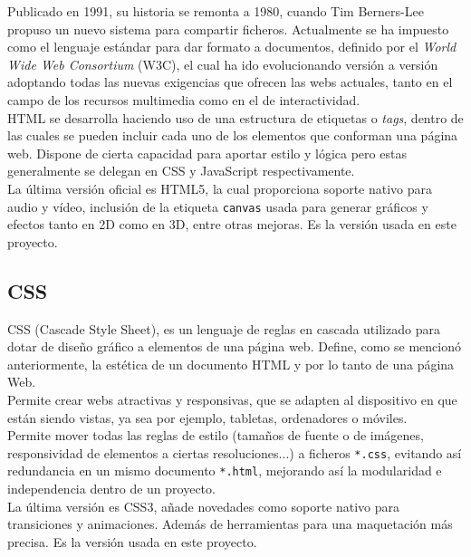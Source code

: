 \documentclass[a4paper, 12pt]{book}
\begin{document}
		Publicado en 1991, su historia se remonta a 1980, cuando Tim Berners-Lee propuso un nuevo sistema para compartir ficheros. Actualmente se ha impuesto como el lenguaje estándar para dar formato a documentos, definido por el \textit{World Wide Web Consortium} (W3C), el cual ha ido evolucionando versión a versión adoptando todas las nuevas exigencias que ofrecen las webs actuales, tanto en el campo de los recursos multimedia como en el de interactividad.\\
		
		HTML se desarrolla haciendo uso de una estructura de etiquetas o \textit{tags}, dentro de las cuales se pueden incluir cada uno de los elementos que conforman una página web. Dispone de cierta capacidad para aportar estilo y lógica pero estas generalmente se delegan en CSS y JavaScript respectivamente.\\
		
		La última versión oficial es HTML5, la cual proporciona soporte nativo para audio y vídeo, inclusión de la etiqueta \texttt{canvas} usada para generar gráficos y efectos tanto en 2D como en 3D, entre otras mejoras. Es la versión usada en este proyecto.
		
	\subsection{CSS}
	\label{subsec:css}
		CSS (Cascade Style Sheet), es un lenguaje de reglas en cascada utilizado para dotar de diseño gráfico a elementos de una página web. Define, como se mencionó anteriormente, la estética de un documento HTML y por lo tanto de una página Web. \\
		
		Permite crear webs atractivas y responsivas, que se adapten al dispositivo en que están siendo vistas, ya sea por ejemplo, tabletas, ordenadores o móviles.\\
		
		Permite mover todas las reglas de estilo (tamaños de fuente o de imágenes, responsividad de elementos a ciertas resoluciones...) a ficheros \texttt{*.css}, evitando así redundancia en un mismo documento \texttt{*.html}, mejorando así la modularidad e independencia dentro de un proyecto.\\
		
		La última versión es CSS3, añade novedades como soporte nativo para transiciones y animaciones. Además de herramientas para una maquetación más precisa. Es la versión usada en este proyecto.
		
\end{document}
